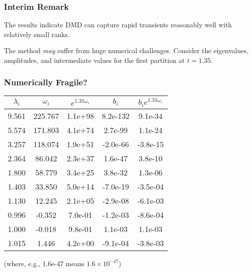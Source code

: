 \documentclass[fleqn]{beamer}
\begin{document}
% 
%  

\begin{frame}
\frametitle{Interim Remark}

The results indicate DMD can capture rapid transients reasonably
well with relatively small ranks.

\vfill
\pause

The method {\it may} suffer from huge numerical challenges.  Consider the
eigenvalues, amplitudes, and intermediate values for the first partition at $t = 1.35$.

\vfill 

\end{frame}

\begin{frame}
\frametitle{Numerically Fragile?}
 
\begin{tabular}{|c|c|c|c|c|}
\hline
 $\lambda_i$ & $\omega_i$ & $e^{1.35 \omega_i}$ & $b_i$ & $b_i e^{1.35 \omega_i}$ \\
\hline
 9.561  & 225.767 & 1.1e+98 & 8.2e-132 & 9.1e-34  \\
 5.574  & 171.803 & 4.1e+74 & 2.7e-99 & 1.1e-24  \\
 3.257  & 118.074 & 1.9e+51 & -2.0e-66 & -3.8e-15  \\
 2.364  & 86.042 & 2.3e+37 & 1.6e-47 & 3.8e-10  \\
 1.800  & 58.779 & 3.4e+25 & 3.8e-32 & 1.3e-06  \\
 1.403  & 33.850 & 5.0e+14 & -7.0e-19 & -3.5e-04  \\
 1.130  & 12.245 & 2.1e+05 & -2.9e-08 & -6.1e-03  \\
 0.996  & -0.352 & 7.0e-01 & -1.2e-03 & -8.6e-04  \\
 1.000  & -0.018 & 9.8e-01 & 1.1e-03 & 1.1e-03  \\
 1.015  & 1.446 & 4.2e+00 & -9.1e-04 & -3.8e-03  \\
\hline
\end{tabular}

{\small
(where, e.g., 1.6e-47 means $1.6\times 10^{-47}$)}
 
\end{frame}
\end{document}
